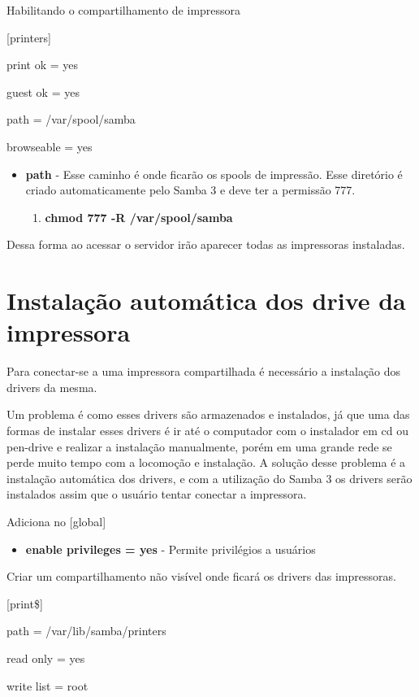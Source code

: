 Habilitando o compartilhamento de impressora

[printers]

print ok = yes

guest ok = yes

path = /var/spool/samba

browseable = yes

\begin{itemize}
	\item \textbf{path} - Esse caminho é onde ficarão os spools de impressão. Esse diretório é criado automaticamente pelo Samba 3 e deve ter a permissão 777.
	\begin{enumerate}
		\item \textbf{chmod 777 -R /var/spool/samba}
	\end{enumerate}
\end{itemize}

Dessa forma ao acessar o servidor irão aparecer todas as impressoras instaladas.

\section{Instalação automática dos drive da impressora}

Para conectar-se a uma impressora compartilhada é necessário a instalação dos drivers da mesma. 

Um problema é como esses drivers são armazenados e instalados, já que uma das formas de instalar esses drivers é ir até o computador com o instalador em cd ou pen-drive e realizar a instalação manualmente, porém em uma grande rede se perde muito tempo com a locomoção e instalação. A solução desse problema é a instalação automática dos drivers, e com a utilização do Samba 3 os drivers serão instalados assim que o usuário tentar conectar a impressora.

Adiciona no [global]

\begin{itemize}
	\item \textbf{enable privileges = yes} - Permite privilégios a usuários
\end{itemize}

Criar um compartilhamento não visível onde ficará os drivers das impressoras.

[print\$]

path = /var/lib/samba/printers

read only = yes

write list = root

